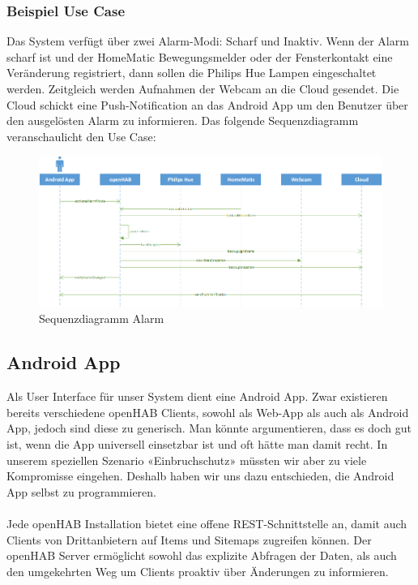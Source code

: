 \subsubsection{Beispiel Use Case}
Das System verfügt über zwei Alarm-Modi: Scharf und Inaktiv. Wenn der Alarm scharf ist und der HomeMatic Bewegungsmelder oder der Fensterkontakt eine Veränderung registriert, dann sollen die Philips Hue Lampen eingeschaltet werden. Zeitgleich werden Aufnahmen der Webcam an die Cloud gesendet. Die Cloud schickt eine Push-Notification an das Android App um den Benutzer über den ausgelösten Alarm zu informieren. Das folgende Sequenzdiagramm veranschaulicht den Use Case:

\begin{figure}[H]
	\centering
		\includegraphics[width=\textwidth]{report/img/sequence_alarm.png}
	\caption{Sequenzdiagramm Alarm}
	\label{fig:sequenceAlarm}
\end{figure}


\subsection{Android App}
Als User Interface für unser System dient eine Android App. Zwar existieren bereits verschiedene openHAB Clients, sowohl als Web-App als auch als Android App, jedoch sind diese zu generisch. Man könnte argumentieren, dass es doch gut ist, wenn die App universell einsetzbar ist und oft hätte man damit recht. In unserem speziellen Szenario «Einbruchschutz» müssten wir aber zu viele Kompromisse eingehen. Deshalb haben wir uns dazu entschieden, die Android App selbst zu programmieren. 
\\ \\
Jede openHAB Installation bietet eine offene REST-Schnittstelle an, damit auch Clients von Drittanbietern auf Items und Sitemaps zugreifen können. Der openHAB Server ermöglicht sowohl das explizite Abfragen der Daten, als auch den umgekehrten Weg um Clients proaktiv über Änderungen zu informieren. 

